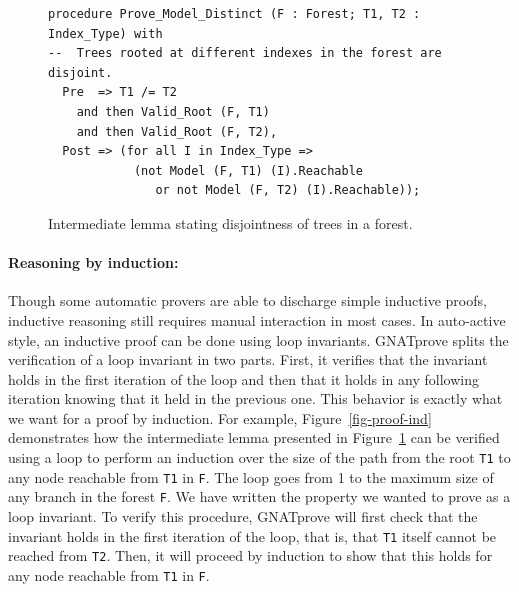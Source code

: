 \documentclass{llncs}
\newcommand{\gnatprove}{GNATprove\xspace}
\begin{document}
\begin{figure}
\begin{small}
\begin{lstlisting}
procedure Prove_Model_Distinct (F : Forest; T1, T2 : Index_Type) with
--  Trees rooted at different indexes in the forest are disjoint.
  Pre  => T1 /= T2
    and then Valid_Root (F, T1)
    and then Valid_Root (F, T2),
  Post => (for all I in Index_Type =>
            (not Model (F, T1) (I).Reachable
               or not Model (F, T2) (I).Reachable));
\end{lstlisting}
\end{small}
\caption{\label{fig-proof-lem} Intermediate lemma stating disjointness of trees in a forest.}
\end{figure}

\paragraph{Reasoning by induction:}
Though some automatic provers are able to discharge simple inductive proofs, inductive reasoning
still requires manual interaction in most cases. In auto-active style, an inductive proof can be done
using loop invariants. \gnatprove splits the
verification of a loop invariant in two parts. First, it verifies that the invariant holds in the first iteration of the
loop and then that it holds in any following iteration knowing that it held in the previous one.
This behavior is exactly what we want for a proof by induction. For example, Figure~\ref{fig-proof-ind}
demonstrates how the intermediate lemma presented in Figure~\ref{fig-proof-lem} can be verified
using a loop to perform an induction over the size of the path from the root \texttt{T1} to any node reachable
from \texttt{T1} in \texttt{F}. The loop goes from 1 to the maximum size of any branch
in the forest \texttt{F}. We have written the property we wanted to prove as a loop invariant. To verify this procedure, \gnatprove will
first check that the invariant holds in the first iteration of the loop, that is, that \texttt{T1} itself cannot
be reached from \texttt{T2}. Then, it will proceed by induction to show that this holds for any node reachable
from \texttt{T1} in \texttt{F}.
\end{document}
